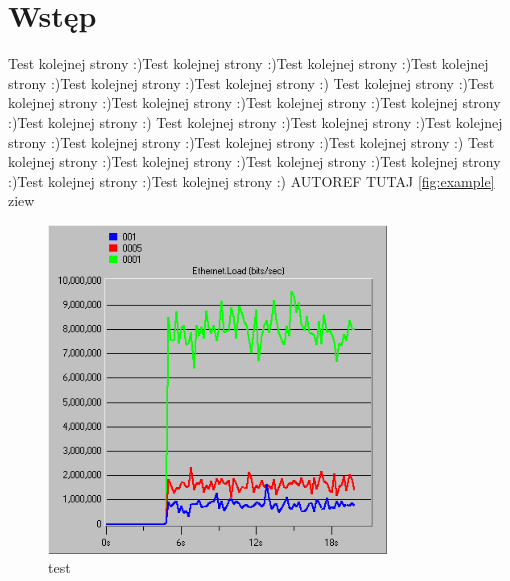 \documentclass{article}
\begin{document}

\begin{tableofcontents}
  \listoffigures
\end{tableofcontents}
\newpage
\section{Wstęp}
Test kolejnej strony :)Test kolejnej strony :)Test kolejnej strony :)Test kolejnej strony :)Test kolejnej strony :)Test kolejnej strony :)
Test kolejnej strony :)Test kolejnej strony :)Test kolejnej strony :)Test kolejnej strony :)Test kolejnej strony :)Test kolejnej strony :)
Test kolejnej strony :)Test kolejnej strony :)Test kolejnej strony :)Test kolejnej strony :)Test kolejnej strony :)Test kolejnej strony :)
Test kolejnej strony :)Test kolejnej strony :)Test kolejnej strony :)Test kolejnej strony :)Test kolejnej strony :)Test kolejnej strony :) AUTOREF TUTAJ \autoref{fig:example} ziew
\begin{figure}[ht]
  \centering
  \includegraphics[width=0.8\textwidth]{screens/samo/load.png}
  \caption{test}
\end{figure}
\end{document}
